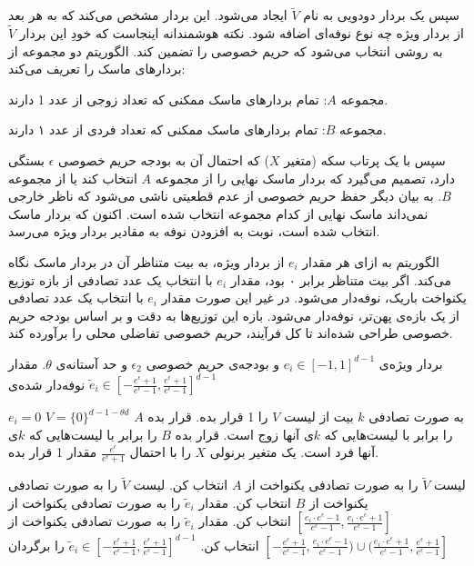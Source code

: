 سپس یک بردار دودویی به نام $\tilde{V}$ ایجاد می‌شود. این بردار مشخص می‌کند که به هر بعد از بردار ویژه چه نوع نوفه‌ای اضافه شود. نکته هوشمندانه اینجاست که خودِ این بردار $\tilde{V}$ به روشی انتخاب می‌شود که حریم خصوصی را تضمین کند. الگوریتم دو مجموعه از بردارهای ماسک را تعریف می‌کند:


 مجموعه $A$: تمام بردارهای ماسک ممکنی که تعداد زوجی از عدد 1 دارند.

 مجموعه $B$: تمام بردارهای ماسک ممکنی که تعداد فردی از عدد ۱ دارند.


سپس با یک پرتاب سکه (متغیر $X$) که احتمال آن به بودجه حریم خصوصی $\epsilon$ بستگی دارد، تصمیم می‌گیرد که بردار ماسک نهایی را از مجموعه $A$ انتخاب کند یا از مجموعه $B$. به بیان دیگر حفظ حریم خصوصی از عدم قطعیتی ناشی می‌شود که ناظر خارجی نمی‌داند ماسک نهایی از کدام مجموعه انتخاب شده است. اکنون که بردار ماسک انتخاب شده است، نوبت به افزودن نوفه به مقادیر بردار ویژه می‌رسد.

الگوریتم به ازای هر مقدار $e_i$ از بردار ویژه، به بیت متناظر آن در بردار ماسک نگاه می‌کند. اگر بیت متناظر برابر ۰ بود، مقدار $e_i$ با انتخاب یک عدد تصادفی از بازه توزیع یکنواخت باریک، نوفه‌دار می‌شود. در غیر این صورت مقدار $e_i$ با انتخاب یک عدد تصادفی از یک بازه‌ی پهن‌تر، نوفه‌دار می‌شود. بازه این توزیع‌ها به دقت و بر اساس بودجه حریم خصوصی طراحی شده‌اند تا کل فرآیند، حریم خصوصی تفاضلی محلی را برآورده کند.

 بردار ویژه‌ی  $e_i \in [-1, 1]^{d-1}$ و بودجه‌ی حریم خصوصی $\epsilon_2$ و حد آستانه‌ی $\theta$.
 مقدار نوفه‌دار شده‌ی $\tilde{e}_i \in [-\frac{e^{\epsilon}+1}{e^{\epsilon}-1}, \frac{e^{\epsilon}+1}{e^{\epsilon}-1}]^{d-1}$

        \State $e_i = 0$
    \EndIf
\EndFor
{} $V = \{0\}^{d-1-\theta d}$
 به صورت تصادفی $k$ بیت از لیست $V$ را 1 قرار بده.
 قرار بده $A$ را برابر با لیست‌هایی که $k$ی آنها زوج است.
 قرار بده $B$ را برابر با لیست‌هایی که $k$ی آنها فرد است.
 یک متغیر برنولی $X$ را با احتمال $\frac{e^{\epsilon}}{e^{\epsilon}+1}$ مقدار 1 قرار بده.

     لیست $\tilde{V}$ را به صورت تصادفی یکنواخت از $A$ انتخاب کن.
\Else
     لیست $\tilde{V}$ را به صورت تصادفی یکنواخت از $B$ انتخاب کن.
\EndIf
{}
         مقدار $\tilde{e}_i$ را به صورت تصادفی یکنواخت از $[\frac{e_i \cdot e^{\epsilon}-1}{e^{\epsilon}-1}, \frac{e_i \cdot e^{\epsilon}+1}{e^{\epsilon}-1}]$ انتخاب کن.
    \Else
         مقدار $\tilde{e}_i$ را به صورت تصادفی یکنواخت از $[-\frac{e^{\epsilon}+1}{e^{\epsilon}-1}, \frac{e_i \cdot e^{\epsilon}-1}{e^{\epsilon}-1}) \cup (\frac{e_i \cdot e^{\epsilon}+1}{e^{\epsilon}-1}, \frac{e^{\epsilon}+1}{e^{\epsilon}-1}]$ انتخاب کن.
    \EndIf
\EndFor
{} $\tilde{e}_i \in [-\frac{e^{\epsilon}+1}{e^{\epsilon}-1}, \frac{e^{\epsilon}+1}{e^{\epsilon}-1}]^{d-1}$ را برگردان

